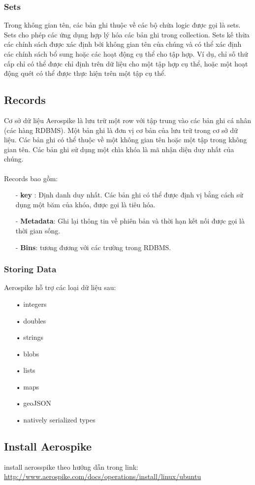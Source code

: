 \documentclass[a4paper,12pt]{report}
\begin{document}
\subsubsection*{Sets}
Trong không gian tên, các bản ghi thuộc về các bộ chứa logic được gọi là sets. Sets cho phép các ứng dụng hợp lý hóa các bản ghi trong collection. Sets kế thừa các chính sách được xác định bởi không gian tên của chúng và có thể xác định các chính sách bổ sung hoặc các hoạt động cụ thể cho tập hợp. Ví dụ, chỉ số thứ cấp chỉ có thể được chỉ định trên dữ liệu cho một tập hợp cụ thể, hoặc một hoạt động quét có thể được thực hiện trên một tập cụ thể.
\subsection*{Records}
Cơ sở dữ liệu Aerospike là lưu trữ một row với tập trung vào các bản ghi cá nhân (các hàng RDBMS). Một bản ghi là đơn vị cơ bản của lưu trữ trong cơ sở dữ liệu. Các bản ghi có thể thuộc về một không gian tên hoặc một tập trong không gian tên. Các bản ghi sử dụng một chìa khóa là mã nhận diện duy nhất của chúng. \\ \\
Records bao gồm:
\begin{itemize}
\item[-] \textbf{key} : Định danh duy nhất. Các bản ghi có thể được định vị bằng cách sử dụng một băm của khóa, được gọi là tiêu hóa.
\item[-] \textbf{Metadata}:  Ghi lại thông tin về phiên bản  và thời hạn kết nối được gọi là thời gian sống.
\item[-] \textbf{Bins}: tương đương với các trường trong RDBMS.
\end{itemize}
\subsubsection*{Storing Data}
Aerospike hỗ trợ các loại dữ liệu sau:
\begin{itemize}
\item[•] integers
\item[•] doubles
\item[•] strings
\item[•] blobs
\item[•] lists
\item[•] maps
\item[•] geoJSON
\item[•] natively serialized types
\end{itemize}
\subsection*{Install Aerospike}
install aerosspike theo hướng dẫn trong link: \url{http://www.aerospike.com/docs/operations/install/linux/ubuntu} \\
\end{document}
